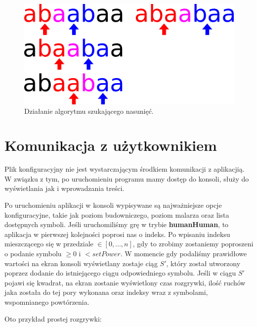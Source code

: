 \documentclass[document]{xmgr}
\begin{document}
\begin{figure}[H]
    \centering
    \includegraphics[scale = 0.2]{images/overlapFinding}
    \caption{Działanie algorytmu szukającego nasunięć.}
    \label{fig:overlapFinding}
\end{figure}

\section{Komunikacja z użytkownikiem}
Plik konfiguracyjny nie jest wystarczającym środkiem komunikacji z aplikacjią. W związku z tym, po uruchomieniu programu mamy dostęp do konsoli, służy do wyświetlania jak i wprowadzania treści.

Po uruchomieniu aplikacji w konsoli wypisywane są najważniejsze opcje konfiguracyjne, takie jak poziom budowniczego, poziom malarza oraz lista dostępnych symboli. Jeśli uruchomiliśmy grę w trybie \textbf{humanHuman}, to aplikacja w pierwszej kolejności poprosi nas o indeks. Po wpisaniu indeksu mieszczącego się w przedziale $\in [0,...,n]$, gdy to zrobimy zostaniemy poproszeni o podanie symbolu $\geq 0$ i $< setPower$. W momencie gdy podaliśmy prawidłowe wartości na ekran konsoli wyświetlany zostaje ciąg $S'$, który został utworzony poprzez dodanie do istniejącego ciągu odpowiedniego symbolu. Jeśli w ciągu $S'$ pojawi się kwadrat, na ekran zostanie wyświetlony czas rozgrywki, ilość ruchów jaka została do tej pory wykonana oraz indeksy wraz z symbolami, wspomnianego powtórzenia.

Oto przykład prostej rozgrywki:
\end{document}
